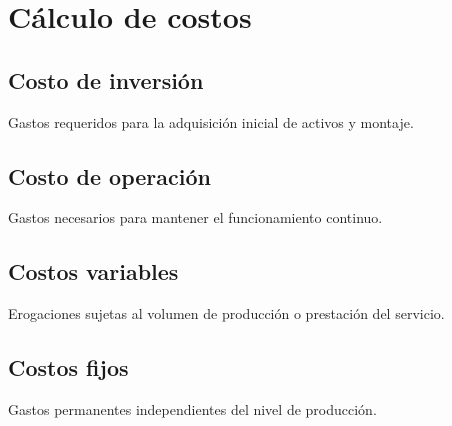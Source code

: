 \section{Cálculo de costos}
\label{sec:calculo_costos}

\subsection{Costo de inversión}
Gastos requeridos para la adquisición inicial de activos y montaje.

\subsection{Costo de operación}
Gastos necesarios para mantener el funcionamiento continuo.

\subsection{Costos variables}
Erogaciones sujetas al volumen de producción o prestación del servicio.

\subsection{Costos fijos}
Gastos permanentes independientes del nivel de producción.


